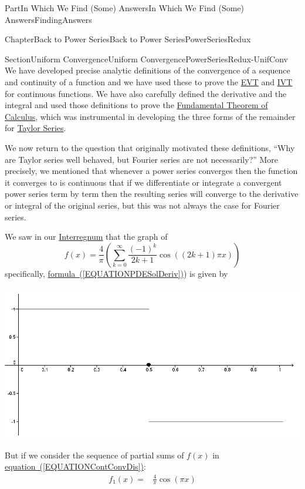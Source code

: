 \documentclass[oneside,10pt,]{book}
\newcommand{\xreffont}{\relax}
\numberwithin{equation}{part}
\newcommand{\amp}{&}
\begin{document}
\begin{partptx}{Part}{In Which We Find (Some) Answers}{}{In Which We Find (Some) Answers}{}{}{FindingAnswers}
\begin{chapterptx}{Chapter}{Back to Power Series}{}{Back to Power Series}{}{}{PowerSeriesRedux}
\begin{sectionptx}{Section}{Uniform Convergence}{}{Uniform Convergence}{}{}{PowerSeriesRedux-UnifConv}
We have developed precise analytic definitions of the convergence of a sequence and continuity of a function and we have used these to prove the \hyperref[thm_EVT]{EVT} and \hyperref[IntermediateValueTheorem]{IVT} for continuous functions. We have also carefully defined the derivative and the integral and used those definitions to prove the \hyperref[THEOREMFTCCauchy]{Fundamental Theorem of Calculus}, which was instrumental in developing the three forms of the remainder for \hyperref[TaylorSeries]{Taylor Series}.%
\par
We now return to the question that originally motivated these definitions, ``Why are Taylor series well behaved, but Fourier series are not necessarily?'' More precisely, we mentioned that whenever a power series converges then the function it converges to is continuous that if we differentiate or integrate a convergent power series term by term then the resulting series will converge to the derivative or integral of the original series, but this was not always the case for Fourier series.%
\par
We saw in our \hyperref[InterregnumPart]{Interregnum}  that the       graph of%
\begin{equation}
f(x) =
\frac{4}{\pi}\left(\sum_{k=0}^\infty\frac{(-1)^k}{2k+1}\cos\left((2k+1)\pi
x\right)\right)\label{EQUATIONContConvDis}
\end{equation}
specifically, \hyperref[EQUATIONPDESolDeriv]{formula~({\xreffont\ref{EQUATIONPDESolDeriv}})}) is given by%
\begin{image}{0.075}{0.85}{0.075}{}%
\includegraphics[width=\linewidth]{external/images/Ch7fig1.png}
\end{image}%
But if we consider the sequence of partial sums of \(f(x)\) in \hyperref[EQUATIONContConvDis]{equation~({\xreffont\ref{EQUATIONContConvDis}})}:%
\begin{align*}
f_1(x)=\amp \frac{4}{\pi}\cos\left(\pi x\right)\\

\end{align*}
\end{sectionptx}
\end{chapterptx}
\end{partptx}
\end{document}
